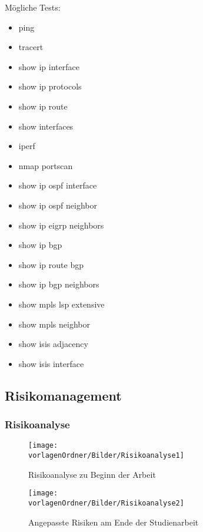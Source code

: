 \documentclass[]{subfiles}
\begin{document}
        Mögliche Tests:
        \begin{itemize}
            \item ping
            \item tracert
            \item show ip interface 
            \item show ip protocols
            \item show ip route
            \item show interfaces
            \item iperf
            \item nmap portscan
            \item show ip ospf interface
            \item show ip ospf neighbor
            \item show ip eigrp neighbors
            \item show ip bgp 
            \item show ip route bgp 
            \item show ip bgp neighbors
            \item show mpls lsp extensive
            \item show mpls neighbor
            \item show isis adjacency
            \item show isis interface
        \end{itemize}

    \subsection{Risikomanagement}
    \label{subsec:Risikomanagement}

    \subsubsection{Risikoanalyse}
    \begin{figure}[!h]
        \begin{center}
            \texttt{[image: \\vorlagenOrdner/Bilder/Risikoanalyse1]}
        \end{center}
        \caption{Risikoanalyse zu Beginn der Arbeit}
    \end{figure}

    \newpage

    \begin{figure}[!h]
        \begin{center}
            \texttt{[image: \\vorlagenOrdner/Bilder/Risikoanalyse2]}
        \end{center}
        \caption{Angepasste Risiken am Ende der Studienarbeit}
    \end{figure}
\end{document}
